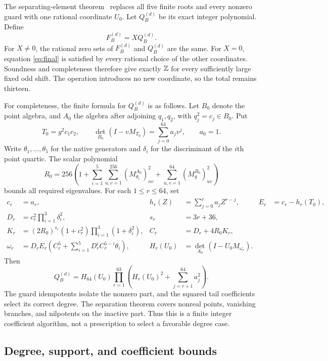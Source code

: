 \documentclass[11pt,a4paper]{article}
\begin{document}
The separating-element theorem~\cite{Active} replaces all five
finite roots and every nonzero guard with one rational coordinate
$U_0$. Let $Q_B^{(d)}$ be its exact integer polynomial. Define
\begin{equation}\label{eq:final}
                         F_B^{(d)}=XQ_B^{(d)}.
\end{equation}
For $X\ne0$, the rational zero sets of $F_B^{(d)}$ and $Q_B^{(d)}$
are the same. For $X=0$, equation \eqref{eq:final} is satisfied
by every rational choice of the other coordinates. Soundness and
completeness therefore give exactly $\mathbb Z$ for every sufficiently
large fixed odd shift. The operation introduces no new coordinate,
so the total remains thirteen.

For completeness, the finite formula for $Q_B^{(d)}$ is as follows.
Let $B_0$ denote the point algebra, and $A_0$ the algebra after
adjoining $q_1,q_2$, with $q_j^2=c_j\in B_0$. Put
\[
 T_0=g^2c_1c_2,\qquad
 \det_{B_0}(I-vM_{T_0})=\sum_{j=0}^{64}a_jv^j,\qquad a_0=1.
\]
Write $\theta_1,\ldots,\theta_5$ for the native generators and
$\delta_i$ for the discriminant of the $i$th point quartic.
The scalar polynomial
\[
 R_0=256\left(1+\sum_{i=1}^{5}\sum_{u,v=1}^{256}
                  (M_{\theta_i}^{A_0})_{uv}^2
       +\sum_{u,v=1}^{64}(M_g^{B_0})_{uv}^2\right)
\]
bounds all required eigenvalues. For each $1\le r\le64$, set
\begin{align*}
 c_r&=a_r,&h_r(Z)&=\sum_{j=0}^r a_jZ^{r-j},&E_r&=c_r-h_r(T_0),\\
 D_r&=c_r^2\prod_{i=1}^3\delta_i^2,&s_r&=3r+36,\\
 K_r&=(2R_0)^{s_r}(1+c_r^2)\prod_{i=1}^3(1+\delta_i^2),&
 C_r&=D_r+4R_0K_r,\\
 \omega_r&=D_rE_r\left(C_r^5+\sum_{i=1}^5D_r^iC_r^{5-i}\theta_i\right),&
 H_r(U_0)&=\det_{A_0}(I-U_0M_{\omega_r}).
\end{align*}
Then
\[
 Q_B^{(d)}=H_{64}(U_0)\prod_{r=1}^{63}
                 \left(H_r(U_0)^2+\sum_{j=r+1}^{64}a_j^2\right).
\]
The guard idempotents isolate the nonzero part, and the squared tail
coefficients select its correct degree. The separation theorem
covers nonreal points, vanishing branches, and nilpotents on the
inactive part. Thus this is a finite integer coefficient algorithm,
not a prescription to select a favorable degree case.

\subsection{Degree, support, and coefficient bounds}
\end{document}
